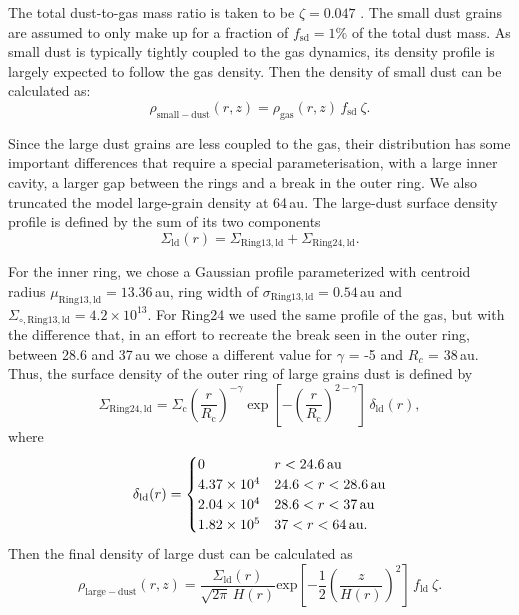 \documentclass[letters,usenatbib,times]{mnras}
\begin{document}
The total dust-to-gas mass ratio is taken to be $\zeta = 0.047$ \citep[as in][]{Rosenfeld_2013}. The small dust grains are assumed to only make up for a fraction of $f_\mathrm{sd}=1\%$ of the total dust mass. As small dust is typically tightly coupled to the gas dynamics, its density profile is largely expected to follow the gas density. Then the density of small dust can be calculated as:
\begin{equation}
\rho_{\mathrm{small-dust}}(r,z)=\rho_{\mathrm{gas}}(r,z)\, f_{\mathrm{sd}} \: \zeta .
\end{equation}

Since the large dust grains are less coupled to the gas, their distribution has some important differences that require a special parameterisation, with a large inner cavity, a larger gap between the rings and a break in the outer ring. We also truncated the model large-grain density at 64\,au. The large-dust surface density profile is defined by the sum of its two components
\begin{equation}
  \Sigma_{\mathrm{ld}}(r) = 
  \Sigma_{\mathrm{Ring13,ld}} + \Sigma_{\mathrm{Ring24,ld}}.
\end{equation}

For the inner ring, we chose a Gaussian profile parameterized with centroid radius $\mu_{\mathrm{Ring13, ld}}=13.36$\,au, ring width of $\sigma_{\mathrm{Ring13,ld}}=0.54$\,au and $\Sigma_{\circ,\mathrm{Ring13,ld}}=4.2\times10^{13}$. For Ring24 we used the same profile of the gas, but with the difference that, in an effort to recreate the break seen in the outer ring, between 28.6 and 37\,au we chose a different value for $\gamma$ = -5 and $R_c$ = 38\,au. Thus, the surface density of the outer ring of large grains dust is defined by
\begin{equation}
    \Sigma_{\mathrm{Ring24,ld}} = \Sigma_{\mathrm{c}} \left(\frac{r}{R_{\mathrm{c}}}\right)^{-\gamma} \exp\left[-\left(\frac{r}{R_{\mathrm{c}}}\right)^{2-\gamma}\right]\,\delta_{\mathrm{ld}}(r),
\end{equation}
where
\begin{equation}
  \delta_{\mathrm{ld}}(r) =
  \begin{cases}
  0                 & r < 24.6\text{\,au} \\
  4.37 \times10^{4} & 24.6 < r < 28.6\text{\,au} \\
  2.04 \times10^{4} & 28.6 < r < 37\text{\,au} \\
  1.82 \times10^{5} & 37   < r < 64\text{\,au.} \\
  \end{cases}
\end{equation}
Then the final density of large dust can be calculated as
\begin{equation}
\rho_{\mathrm{large-dust}}(r,z)=
\frac{\Sigma_{\mathrm{ld}}(r)}{\sqrt{2\pi} \, H(r)} \mathrm{exp}\left[-\frac{1}{2} \left(\frac{z}{H(r)}\right)^2\right] \, f_{\mathrm{ld}} \: \zeta .
\end{equation}
\end{document}
